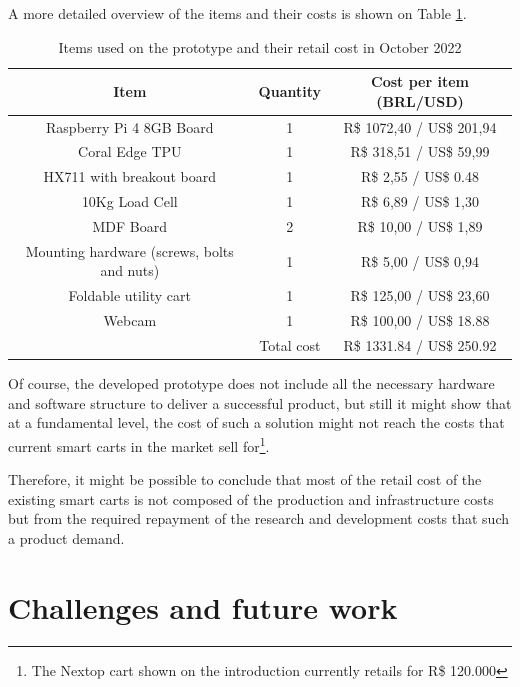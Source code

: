\documentclass[openright]{normas-utf-tex} %
\begin{document}
A more detailed overview of the items and their costs is shown on Table \ref{tbl:cost}.

\begin{table}[H]
	\centering
	\label{tab:correlacao}
	\begin{tabular}{c c c}
		\hline 
        Item & Quantity & Cost per item (BRL/USD) \\
		\hline
        Raspberry Pi 4 8GB Board &  1 & R\$ 1072,40 / US\$ 201,94 \\
        Coral Edge TPU &  1 & R\$ 318,51 / US\$ 59,99 \\
        HX711 with breakout board &  1  & R\$ 2,55 / US\$ 0.48 \\
        10Kg Load Cell & 1 & R\$ 6,89 / US\$ 1,30 \\
        MDF Board &  2  & R\$ 10,00 / US\$ 1,89 \\
        Mounting hardware (screws, bolts and nuts) &  1  & R\$ 5,00 / US\$ 0,94 \\
        Foldable utility cart &  1  & R\$ 125,00 / US\$ 23,60 \\
        Webcam &  1  & R\$ 100,00 / US\$ 18.88 \\
		\hline 
        & Total cost & R\$ 1331.84 / US\$ 250.92 \\
        \hline
	\end{tabular}
    \caption[Items used on the prototype and their approximate retail cost in Brazil as of October 2022]{Items used on the prototype and their retail cost in October 2022}
    \label{tbl:cost}
\end{table}

Of course, the developed prototype does not include all the necessary hardware
and software structure to deliver a successful product, but still it might show that at a
fundamental level, the cost of such a solution might not reach the costs that
current smart carts in the market sell for\footnote{The Nextop cart shown on the
introduction currently retails for R\$ 120.000}.

Therefore, it might be possible to conclude that most of the retail cost of the
existing smart carts is not composed of the production and infrastructure costs
but from the required repayment of the research and development costs that such
a product demand.

\section{Challenges and future work}
\end{document}

